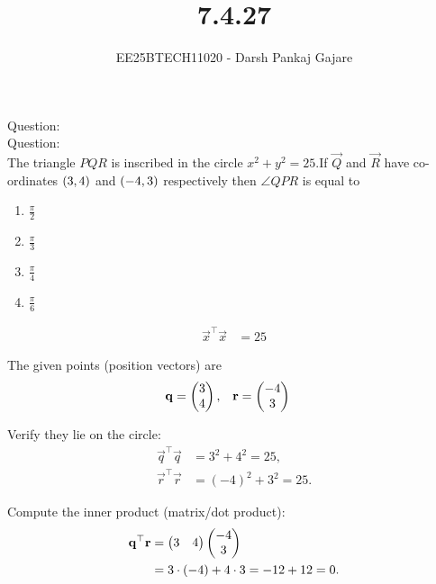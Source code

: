 \documentclass{beamer}
\let\solution\relax
\numberwithin{equation}{section}
\begin{document}
\title{7.4.27}
\author{EE25BTECH11020 - Darsh Pankaj Gajare}
{\let\newpage\relax\maketitle}
Question:\\

Question:\\
The triangle $PQR$ is inscribed in the circle $x^2+y^2=25$.If $\vec{Q}$ and $\vec{R}$ have co-ordinates $\left(3,4\right)$ and $\left(-4,3\right)$ respectively then $\angle QPR$ is equal to
\begin{multicols}{4}
	\begin{enumerate}[label=(\Alph*)]
		\item $\frac{\pi}{2}$
		\item $\frac{\pi}{3}$
		\item $\frac{\pi}{4}$
		\item $\frac{\pi}{6}$
	\end{enumerate}
\end{multicols}
\solution
\begin{table}[H]
	\centering
	\caption{}
	
	\label{}
\end{table}
\begin{align}
\vec{x}^\top\vec{x} &= 25
\end{align}

The given points (position vectors) are
\begin{align}
\mathbf{q} &= \begin{pmatrix}3\\4\end{pmatrix}, & \mathbf{r} &= \begin{pmatrix}-4\\3\end{pmatrix}
\end{align}

Verify they lie on the circle:
\begin{align}
\vec{q}^\top\vec{q} &= 3^2+4^2 = 25, \\
\vec{r}^\top\vec{r} &= (-4)^2+3^2 = 25.
\end{align}

Compute the inner product (matrix/dot product):
\begin{align}
\mathbf{q}^\top\mathbf{r} &= \begin{pmatrix}3 & 4\end{pmatrix}\begin{pmatrix}-4\\3\end{pmatrix} \\
&= 3\cdot(-4) + 4\cdot 3 = -12 + 12 = 0.
\end{align}
\end{document}
